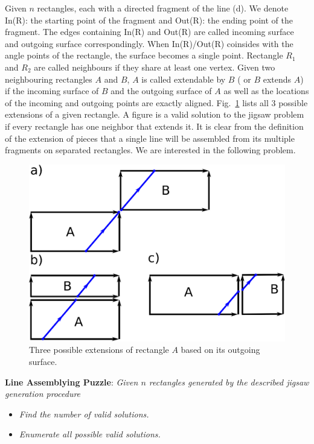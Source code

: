 \documentclass[a4paper]{article}
\begin{document}
Given $n$ rectangles, each with a directed fragment of the line (d). We denote In(R): 
    the starting point of the fragment and Out(R): the ending point of
the fragment. The edges containing In(R) and Out(R) are called incoming surface and outgoing surface correspondingly. When In(R)/Out(R) coinsides with the
angle points of the rectangle, the surface becomes a single point.
Rectangle $R_1$ and $R_2$ are called neighbours if they share at least one vertex. Given two neighbouring rectangles $A$ and $B$, $A$ is
called extendable by $B$ ( or $B$ extends $A$) if the incoming surface of $B$ and the outgoing surface of $A$ as well as the locations of
the incoming and outgoing points are exactly aligned. Fig.~\ref{fig:basic} lists all 3 possible extensions of a given rectangle.
A figure is a valid solution to the jigsaw problem if every rectangle has one neighbor that extends it.
It is clear from the definition of the extension of pieces that a single line will be assembled from its multiple fragments on separated rectangles.
We are interested in the following problem.
\begin{figure}
\begin{center}
\includegraphics[scale=0.3]{fig/basic.eps}
\end{center}
\label{fig:basic}
\caption{Three possible extensions of rectangle $A$ based on its outgoing surface.}
\end{figure}

\textbf{Line Assemblying Puzzle}: \emph{Given $n$ rectangles generated by the described jigsaw generation procedure}
\begin{itemize}
\item \emph{Find the number of valid solutions.}
\item \emph{Enumerate all possible valid solutions.}
\end{itemize}
\end{document}
